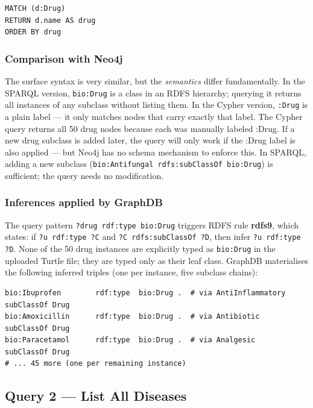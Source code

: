 \documentclass[11pt,a4paper]{article}
\begin{document}
\begin{lstlisting}[style=cypher, caption={Cypher equivalent: list all drugs.}]
MATCH (d:Drug)
RETURN d.name AS drug
ORDER BY drug
\end{lstlisting}

\subsubsection*{Comparison with Neo4j}

The surface syntax is very similar, but the \emph{semantics} differ
fundamentally.  In the SPARQL version, \texttt{bio:Drug} is a class in an RDFS
hierarchy; querying it returns all instances of any subclass without listing
them.  In the Cypher version, \texttt{:Drug} is a plain label — it only
matches nodes that carry exactly that label. The Cypher query returns all 50 drug nodes because each was manually labeled :Drug. If a new drug subclass is added later, the query will only work if the :Drug label is also applied — but Neo4j has no schema mechanism to enforce this.  In SPARQL, adding a new subclass
(\texttt{bio:Antifungal rdfs:subClassOf bio:Drug}) is sufficient; the query
needs no modification.

\subsubsection*{Inferences applied by GraphDB}

The query pattern \texttt{?drug rdf:type bio:Drug} triggers RDFS rule \textbf{rdfs9},
which states: if \texttt{?u rdf:type ?C} and \texttt{?C rdfs:subClassOf ?D}, then
infer \texttt{?u rdf:type ?D}. None of the 50 drug instances are explicitly typed
as \texttt{bio:Drug} in the uploaded Turtle file; they are typed only as their leaf
class. GraphDB materialises the following inferred triples (one per instance, five
subclass chains):

\begin{lstlisting}[style=turtle]
bio:Ibuprofen        rdf:type  bio:Drug .  # via AntiInflammatory subClassOf Drug
bio:Amoxicillin      rdf:type  bio:Drug .  # via Antibiotic       subClassOf Drug
bio:Paracetamol      rdf:type  bio:Drug .  # via Analgesic        subClassOf Drug
# ... 45 more (one per remaining instance)
\end{lstlisting}


\subsection{Query 2 — List All Diseases}
\end{document}
